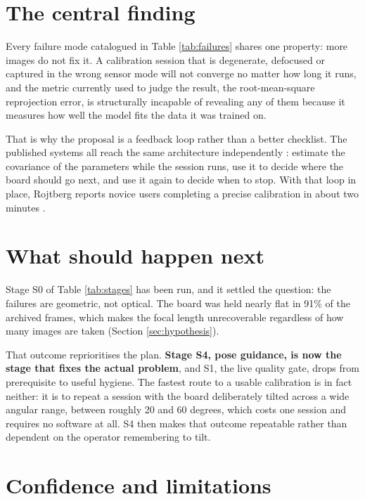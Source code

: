 \section{The central finding}

Every failure mode catalogued in Table \ref{tab:failures} shares one property: more images do not fix it. A calibration session that is degenerate, defocused or captured in the wrong sensor mode will not converge no matter how long it runs, and the metric currently used to judge the result, the root-mean-square reprojection error, is structurally incapable of revealing any of them because it measures how well the model fits the data it was trained on.

That is why the proposal is a feedback loop rather than a better checklist. The published systems all reach the same architecture independently \cite{richardson2013aprilcal,rojtberg2018pose,peng2019wizard,tan2025stereoposes}: estimate the covariance of the parameters while the session runs, use it to decide where the board should go next, and use it again to decide when to stop. With that loop in place, Rojtberg reports novice users completing a precise calibration in about two minutes \cite{rojtberg2019guidance}.

\section{What should happen next}

Stage S0 of Table \ref{tab:stages} has been run, and it settled the question: the failures are geometric, not optical. The board was held nearly flat in 91\% of the archived frames, which makes the focal length unrecoverable regardless of how many images are taken (Section \ref{sec:hypothesis}).

That outcome reprioritises the plan. \textbf{Stage S4, pose guidance, is now the stage that fixes the actual problem}, and S1, the live quality gate, drops from prerequisite to useful hygiene. The fastest route to a usable calibration is in fact neither: it is to repeat a session with the board deliberately tilted across a wide angular range, between roughly 20 and 60 degrees, which costs one session and requires no software at all. S4 then makes that outcome repeatable rather than dependent on the operator remembering to tilt.

\section{Confidence and limitations}


